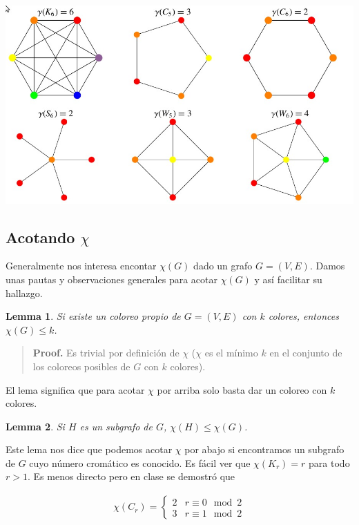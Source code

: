 \documentclass[a4paper]{article}
\newtheorem{lemma}{Lemma}
\newtheorem{lemma}{Lemma}
\begin{document}
\begin{center}
\includegraphics[scale=0.35]{coloring}
\end{center}

\subsection{Acotando $\chi$}

Generalmente nos interesa encontar $\chi(G)$ dado un grafo $G = (V, E) $. Damos
unas pautas y observaciones generales para acotar $\chi(G)$ y así facilitar su
hallazgo.

\begin{lemma}
    Si existe un coloreo propio de $G = (V, E)$ con $k$ colores, entonces
    $\chi(G) \leq k$.
\end{lemma}


\small
\begin{quote}

\textbf{Proof.} Es trivial por definición de $\chi$ ($\chi$ es el mínimo $k$ en
el conjunto de los coloreos posibles de $G$ con $k$ colores).

\end{quote}
\normalsize

El lema significa que para acotar $\chi$ por arriba solo basta dar un coloreo
con $k$ colores.

\begin{lemma}
    Si $H$ es un subgrafo de $G$, $\chi(H) \leq \chi(G)$.
\end{lemma}

Este lema nos dice que podemos acotar $\chi$ por abajo si encontramos un
subgrafo de $G$ cuyo número cromático es conocido. Es fácil ver que $\chi(K_r) =
r$ para todo $r > 1$. Es menos directo pero en clase se demostró que

\begin{align*}
    \chi(C_r) = \begin{cases}
        2 & r \equiv 0 \mod 2  \\ 
        3 & r \equiv 1 \mod 2 
    \end{cases}
\end{align*}
\end{document}
